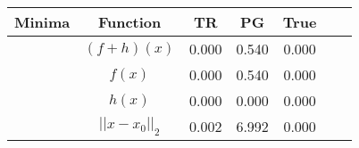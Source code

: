 \begin{tabular}{| c |c |c || c |c |c |c |}
    \hline
Minima    %
    \rowcolor[gray]{0.9}
   & Function & TR & PG & True \\
    \hline
  \rowcolor[gray]{0.7}
     & $ (f + h)(x) $ & 0.000 & 0.540 & 0.000 \\
  \rowcolor[gray]{0.8}
     & $ f(x) $ & 0.000 & 0.540 & 0.000 \\
  \rowcolor[gray]{0.7}
     & $ h(x) $ & 0.000 & 0.000 & 0.000 \\
  \rowcolor[gray]{0.8}
     & $ ||x - x_0||_2 $ & 0.002 & 6.992 & 0.000 \\
\end{tabular}
